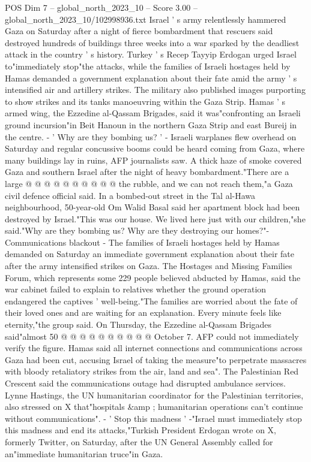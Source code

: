 \begin{textsample}{POS Dim 7 – global\_north\_2023\_10 – Score 3.00 – global\_north\_2023\_10/102998936.txt}  \label{ex:f7_pos_422}
Israel ' s army relentlessly hammered Gaza on Saturday after a night of fierce bombardment that rescuers said destroyed hundreds of buildings three weeks into a war sparked by the deadliest attack in the country ' s history.
Turkey ' s Recep Tayyip Erdogan urged Israel to"immediately stop"the attacks, while the families of Israeli hostages held by Hamas demanded a government explanation about their fate amid the army ' s intensified air and artillery strikes.
The military also published images purporting to show strikes and its tanks manoeuvring within the Gaza Strip.
Hamas ' s armed wing, the Ezzedine al-Qassam Brigades, said it was"confronting an Israeli ground incursion"in Beit Hanoun in the northern Gaza Strip and east Bureij in the centre. - ' Why are they bombing us? ' - Israeli warplanes flew overhead on Saturday and regular concussive booms could be heard coming from Gaza, where many buildings lay in ruins, AFP journalists saw.
A thick haze of smoke covered Gaza and southern Israel after the night of heavy bombardment."There are a large @ @ @ @ @ @ @ @ @ @ the rubble, and we can not reach them,"a Gaza civil defence official said.
In a bombed-out street in the Tal al-Hawa neighbourhood, 50-year-old Om Walid Basal said her apartment block had been destroyed by Israel."This was our house.
We lived here just with our children,"she said."Why are they bombing us?
Why are they destroying our homes?"- Communications blackout - The families of Israeli hostages held by Hamas demanded on Saturday an immediate government explanation about their fate after the army intensified strikes on Gaza.
The Hostages and Missing Families Forum, which represents some 229 people believed abducted by Hamas, said the war cabinet failed to explain to relatives whether the ground operation endangered the captives ' well-being."The families are worried about the fate of their loved ones and are waiting for an explanation.
Every minute feels like eternity,"the group said.
On Thursday, the Ezzedine al-Qassam Brigades said"almost 50 @ @ @ @ @ @ @ @ @ @ October 7.
AFP could not immediately verify the figure.
Hamas said all internet connections and communications across Gaza had been cut, accusing Israel of taking the measure"to perpetrate massacres with bloody retaliatory strikes from the air, land and sea".
The Palestinian Red Crescent said the communications outage had disrupted ambulance services.
Lynne Hastings, the UN humanitarian coordinator for the Palestinian territories, also stressed on X that"hospitals \&amp ; humanitarian operations can't continue without communications". - ' Stop this madness ' -"Israel must immediately stop this madness and end its attacks,"Turkish President Erdogan wrote on X, formerly Twitter, on Saturday, after the UN General Assembly called for an"immediate humanitarian truce"in Gaza.

\end{textsample}
